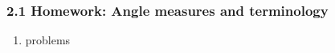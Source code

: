 

\fancyhead[LE]{\thepage}



\subsubsection*{2.1 Homework: Angle measures and terminology}
\begin{enumerate}
  \item problems

\end{enumerate}
